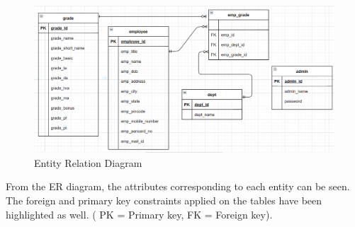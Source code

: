 \documentclass[12pt]{article}
\begin{document}
\begin{figure}[h!]
    \centering
    \includegraphics[width = \columnwidth]{er_diagram.png}
    \caption{Entity Relation Diagram}
    \label{fig:my_label}
\end{figure}
\noindent
From the ER diagram, the attributes corresponding to each entity can be seen. The foreign and primary key constraints applied on the tables have been highlighted as well. ( PK = Primary key, FK = Foreign key).


\newpage                            %
\end{document}
